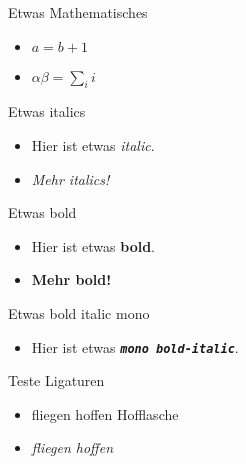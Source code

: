 \documentclass{beamer}
\begin{document}
\begin{frame}
    \begin{block}{Etwas Mathematisches}
        \begin{itemize}
            \item $a = b + 1$
            \item $\alpha \beta = \sum_i i$
        \end{itemize}
    \end{block}
\end{frame}

\begin{frame}
    \begin{block}{Etwas italics}
        \begin{itemize}
            \item Hier ist etwas \textit{italic}. 
            \item \textit{Mehr italics!}
        \end{itemize}
    \end{block}

    \begin{block}{Etwas bold}
        \begin{itemize}
            \item Hier ist etwas \textbf{bold}. 
            \item \textbf{Mehr bold!}
        \end{itemize}
    \end{block}
    
    \begin{block}{Etwas bold italic mono}
        \begin{itemize}
            \item Hier ist etwas \texttt{\textit{\textbf{mono bold-italic}}}. 
        \end{itemize}
    \end{block}
\end{frame}

\begin{frame}
    \begin{block}{Teste Ligaturen}
        \begin{itemize}
            \item fliegen hoffen Hofflasche
            \item \textit{fliegen hoffen}
        \end{itemize}
    \end{block}
\end{frame}
\end{document}
